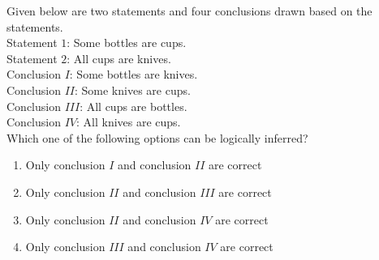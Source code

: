 \item{
Given below are two statements and four conclusions drawn based on the
statements.\\
Statement $1$: Some bottles are cups.\\
Statement $2$: All cups are knives.\\
Conclusion $I$: Some bottles are knives.\\
Conclusion $II$: Some knives are cups.\\
Conclusion $III$: All cups are bottles.\\
Conclusion $IV$: All knives are cups.\\
Which one of the following options can be logically inferred?
\begin{enumerate}
\item Only conclusion $I$ and conclusion $II$ are correct
\item Only conclusion $II$ and conclusion $III$ are correct
\item Only conclusion $II$ and conclusion $IV$ are correct
\item Only conclusion $III$ and conclusion $IV$ are correct
\end{enumerate}
}
